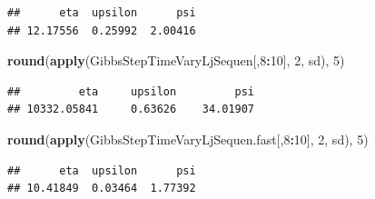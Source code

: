 \documentclass[
]{article}
\newenvironment{Shaded}{\begin{snugshade}}{\end{snugshade}}
\newcommand{\DecValTok}[1]{\textcolor[rgb]{0.00,0.00,0.81}{#1}}
\newcommand{\FunctionTok}[1]{\textcolor[rgb]{0.13,0.29,0.53}{\textbf{#1}}}
\newcommand{\NormalTok}[1]{#1}
\newcommand{\SpecialCharTok}[1]{\textcolor[rgb]{0.81,0.36,0.00}{\textbf{#1}}}
\begin{document}
\begin{verbatim}
##      eta  upsilon      psi 
## 12.17556  0.25992  2.00416
\end{verbatim}

\begin{Shaded}
\begin{Highlighting}[]
\FunctionTok{round}\NormalTok{(}\FunctionTok{apply}\NormalTok{(GibbsStepTimeVaryLjSequen[,}\DecValTok{8}\SpecialCharTok{:}\DecValTok{10}\NormalTok{], }\DecValTok{2}\NormalTok{, sd), }\DecValTok{5}\NormalTok{)}
\end{Highlighting}
\end{Shaded}

\begin{verbatim}
##         eta     upsilon         psi 
## 10332.05841     0.63626    34.01907
\end{verbatim}

\begin{Shaded}
\begin{Highlighting}[]
\FunctionTok{round}\NormalTok{(}\FunctionTok{apply}\NormalTok{(GibbsStepTimeVaryLjSequen.fast[,}\DecValTok{8}\SpecialCharTok{:}\DecValTok{10}\NormalTok{], }\DecValTok{2}\NormalTok{, sd), }\DecValTok{5}\NormalTok{)}
\end{Highlighting}
\end{Shaded}

\begin{verbatim}
##      eta  upsilon      psi 
## 10.41849  0.03464  1.77392
\end{verbatim}
\end{document}
